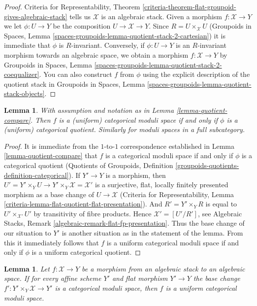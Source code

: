 \documentclass{stacks-project}
\theoremstyle{plain}
\newtheorem{lemma}[subsection]{Lemma}
\theoremstyle{definition}
\theoremstyle{remark}
\numberwithin{equation}{subsection}
\begin{document}
\begin{proof}
Criteria for Representability, Theorem
\ref{criteria-theorem-flat-groupoid-gives-algebraic-stack}
tells us $\mathcal{X}$ is an algebraic stack.
Given a morphism $f : \mathcal{X} \to Y$ we let $\phi : U \to Y$ be
the composition $U \to \mathcal{X} \to Y$. Since $R = U \times_\mathcal{X} U$
(Groupoids in Spaces, Lemma
\ref{spaces-groupoids-lemma-quotient-stack-2-cartesian})
it is immediate that $\phi$ is $R$-invariant.
Conversely, if $\phi : U \to Y$ is an $R$-invariant morphism towards
an algebraic space, we obtain a morphism
$f : \mathcal{X} \to Y$ by
Groupoids in Spaces, Lemma
\ref{spaces-groupoids-lemma-quotient-stack-2-coequalizer}.
You can also construct $f$ from $\phi$ using the explicit description of
the quotient stack in
Groupoids in Spaces, Lemma
\ref{spaces-groupoids-lemma-quotient-stack-objects}.
\end{proof}

\begin{lemma}
\label{lemma-categorical-quotient-compare}
With assumption and notation as in Lemma \ref{lemma-quotient-compare}.
Then $f$ is a (uniform) categorical moduli space
if and only if $\phi$ is a (uniform) categorical quotient.
Similarly for moduli spaces in a full subcategory.
\end{lemma}

\begin{proof}
It is immediate from the $1$-to-$1$ correspondence established in
Lemma \ref{lemma-quotient-compare} that $f$ is a categorical moduli space
if and only if $\phi$ is a categorical quotient
(Quotients of Groupoids, Definition
\ref{groupoids-quotients-definition-categorical}).
If $Y' \to Y$ is a morphism, then
$U' = Y' \times_Y U \to Y' \times_Y \mathcal{X} = \mathcal{X}'$
is a surjective, flat, locally finitely presented morphism
as a base change of $U \to \mathcal{X}$
(Criteria for Representability, Lemma
\ref{criteria-lemma-flat-quotient-flat-presentation}).
And $R' = Y' \times_Y R$ is equal to $U' \times_{\mathcal{X}'} U'$
by transitivity of fibre products.
Hence $\mathcal{X}' = [U'/R']$, see
Algebraic Stacks, Remark \ref{algebraic-remark-flat-fp-presentation}.
Thus the base change of our situation to $Y'$ is another situation
as in the statement of the lemma. From this it immediately
follows that $f$ is a uniform categorical moduli space
if and only if $\phi$ is a uniform categorical quotient.
\end{proof}

\begin{lemma}
\label{lemma-check-uniform-categorical-quotient-on-affines}
Let $f : \mathcal{X} \to Y$ be a morphism from an algebraic stack
to an algebraic space. If for every affine scheme $Y'$ and flat
morphism $Y' \to Y$ the base change
$f' : Y' \times_Y \mathcal{X} \to Y'$ is a categorical moduli space,
then $f$ is a uniform categorical moduli space.
\end{lemma}
\end{document}
